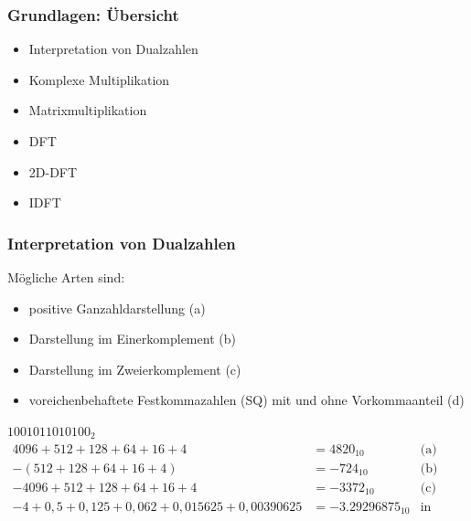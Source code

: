\begin{frame}\frametitle{Grundlagen: Übersicht}
 \begin{itemize}
  \item Interpretation von Dualzahlen
  \item Komplexe Multiplikation
  \item Matrixmultiplikation
  \item DFT
  \item 2D-DFT
  \item IDFT
 \end{itemize}
\end{frame}



\begin{frame}\frametitle{Interpretation von Dualzahlen}
 \medskip
 Mögliche Arten sind:
 \begin{itemize}
  \item positive Ganzahldarstellung (a)
  \item Darstellung im Einerkomplement (b)
  \item Darstellung im Zweierkomplement (c)
  \item voreichenbehaftete Festkommazahlen (SQ) mit und ohne Vorkommaanteil (d)
 \end{itemize}
\medskip
\hspace{1cm}$1001011010100_2$
 \begin{align*}
    4096+512+128+64+16+4 &=  4820_{10}   &\textrm{(a)}\\
    - (512+128+64+16+4) & = -724_{10}   &\textrm{(b)}\\
   -4096+512+128+64+16+4 &= -3372_{10}   &\textrm{(c)}\\
   -4+0,5+0,125+0,062+0,015625+0,00390625 &= -3.29296875_{10} &\textrm{in S2Q10 (d)}
 \end{align*} 
\end{frame}

